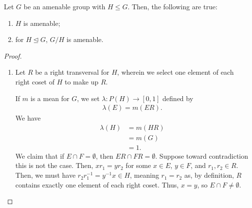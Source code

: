 \begin{proposition}\label{prop:subgroups_quotientgroups_amenability}
  Let $G$ be an amenable group with $H\leq G$. Then, the following are true:
  \begin{enumerate}[(1)]
    \item $H$ is amenable;
    \item for $H\trianglelefteq G$, $G/H$ is amenable.
  \end{enumerate}
\end{proposition}
\begin{proof}\hfill
  \begin{enumerate}[(1)]
    \item Let $R$ be a right transversal for $H$, wherein we select one element of each right coset of $H$ to make up $R$.\newline

      If $m$ is a mean for $G$, we set $\lambda\colon P(H)\rightarrow [0,1]$ defined by
      \begin{align*}
        \lambda(E) = m\left(ER\right).
      \end{align*}
       We have
      \begin{align*}
        \lambda(H) &= m\left(HR\right)\\
                   &= m\left(G\right)\\
                   &= 1.
      \end{align*}
      We claim that if $E\cap F = \emptyset$, then $ER \cap FR = \emptyset$. Suppose toward contradiction this is not the case. Then, $xr_1 = yr_2$ for some $x\in E$, $y\in F$, and $r_1,r_2\in R$. Then, we must have $r_2r_1^{-1} = y^{-1}x \in H$, meaning $r_1 = r_2$ as, by definition, $R$ contains exactly one element of each right coset. Thus, $x=y$, so $E\cap F \neq \emptyset$.\newline


\end{enumerate}
\end{proof}

